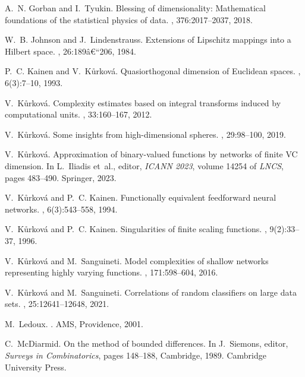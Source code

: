 \documentclass{elsarticle}
\begin{document}
\begin{thebibliography}{10}
A.~N. Gorban and I.~Tyukin.
\newblock Blessing of dimensionality: Mathematical foundations of the
  statistical physics of data.
, 376:2017--2037,
  2018.

W.~B. Johnson and J.~Lindenstrauss.
\newblock Extensions of {L}ipschitz mappings into a {H}ilbert space.
, 26:189â€“206, 1984.

P.~C. Kainen and V.~K\r{u}rkov\'a.
\newblock Quasiorthogonal dimension of {E}uclidean spaces.
, 6(3):7--10, 1993.

V.~K\r{u}rkov\'{a}.
\newblock Complexity estimates based on integral transforms induced by
  computational units.
, 33:160--167, 2012.

V.~K\r{u}rkov\'a.
\newblock Some insights from high-dimensional spheres.
, 29:98--100, 2019.

V.~K\r{u}rkov\'a.
\newblock Approximation of binary-valued functions by networks of finite {VC}
  dimension.
\newblock In L.~Iliadis et~al., editor, {\em ICANN 2023}, volume 14254 of {\em
  LNCS}, pages 483--490. Springer, 2023.

V.~K\r{u}rkov\'{a} and P.~C. Kainen.
\newblock Functionally equivalent feedforward neural networks.
, 6(3):543--558, 1994.

V.~K\r{u}rkov\'{a} and P.~C. Kainen.
\newblock Singularities of finite scaling functions.
, 9(2):33--37, 1996.

V.~K\r{u}rkov\'{a} and M.~Sanguineti.
\newblock Model complexities of shallow networks representing highly varying
  functions.
, 171:598--604, 2016.

V.~K\r{u}rkov\'{a} and M.~Sanguineti.
\newblock Correlations of random classifiers on large data sets.
, 25:12641--12648, 2021.

M.~Ledoux.
.
\newblock AMS, Providence, 2001.

C.~McDiarmid.
\newblock On the method of bounded differences.
\newblock In J.~Siemons, editor, {\em Surveys in Combinatorics}, pages
  148--188, Cambridge, 1989. Cambridge University Press.


\end{thebibliography}
\end{document}
